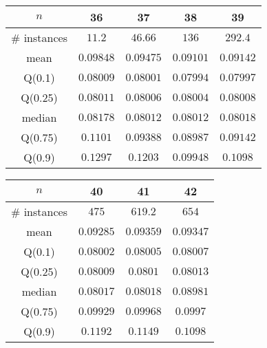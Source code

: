\begin{tabular}{c|cccc} 
\hline 
$n$ & 36 & 37 & 38 & 39 \tabularnewline 
\hline 
\hline 
\# instances & $11.2$ & $46.66$ & $136$ & $292.4$ \tabularnewline 
mean & $0.09848$ & $0.09475$ & $0.09101$ & $0.09142$ \tabularnewline 
Q(0.1) & $0.08009$ & $0.08001$ & $0.07994$ & $0.07997$ \tabularnewline 
Q(0.25) & $0.08011$ & $0.08006$ & $0.08004$ & $0.08008$ \tabularnewline 
median & $0.08178$ & $0.08012$ & $0.08012$ & $0.08018$ \tabularnewline 
Q(0.75) & $0.1101$ & $0.09388$ & $0.08987$ & $0.09142$ \tabularnewline 
Q(0.9) & $0.1297$ & $0.1203$ & $0.09948$ & $0.1098$ \tabularnewline 
\hline 
\end{tabular} 
\medskip{} 

\begin{tabular}{c|ccc} 
\hline 
$n$ & 40 & 41 & 42 \tabularnewline 
\hline 
\hline 
\# instances & $475$ & $619.2$ & $654$ \tabularnewline 
mean & $0.09285$ & $0.09359$ & $0.09347$ \tabularnewline 
Q(0.1) & $0.08002$ & $0.08005$ & $0.08007$ \tabularnewline 
Q(0.25) & $0.08009$ & $0.0801$ & $0.08013$ \tabularnewline 
median & $0.08017$ & $0.08018$ & $0.08981$ \tabularnewline 
Q(0.75) & $0.09929$ & $0.09968$ & $0.0997$ \tabularnewline 
Q(0.9) & $0.1192$ & $0.1149$ & $0.1098$ \tabularnewline 
\hline 
\end{tabular} 
\medskip{} 

